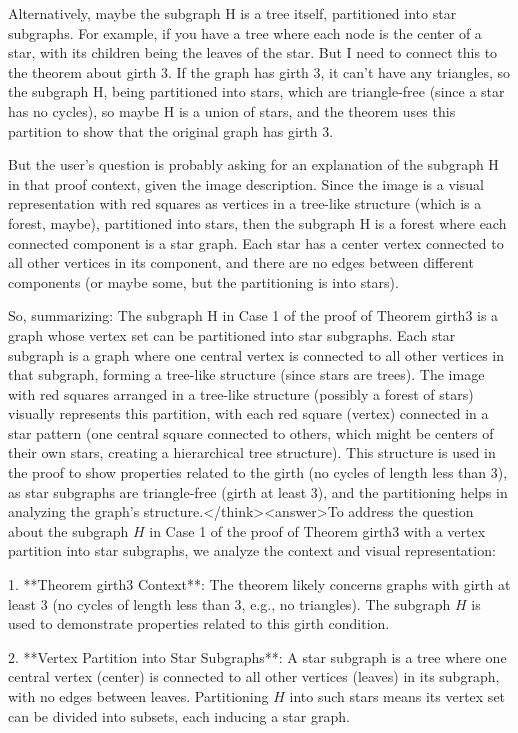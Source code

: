 Alternatively, maybe the subgraph H is a tree itself, partitioned into star subgraphs. For example, if you have a tree where each node is the center of a star, with its children being the leaves of the star. But I need to connect this to the theorem about girth 3. If the graph has girth 3, it can't have any triangles, so the subgraph H, being partitioned into stars, which are triangle-free (since a star has no cycles), so maybe H is a union of stars, and the theorem uses this partition to show that the original graph has girth 3. 

But the user's question is probably asking for an explanation of the subgraph H in that proof context, given the image description. Since the image is a visual representation with red squares as vertices in a tree-like structure (which is a forest, maybe), partitioned into stars, then the subgraph H is a forest where each connected component is a star graph. Each star has a center vertex connected to all other vertices in its component, and there are no edges between different components (or maybe some, but the partitioning is into stars). 

So, summarizing: The subgraph H in Case 1 of the proof of Theorem girth3 is a graph whose vertex set can be partitioned into star subgraphs. Each star subgraph is a graph where one central vertex is connected to all other vertices in that subgraph, forming a tree-like structure (since stars are trees). The image with red squares arranged in a tree-like structure (possibly a forest of stars) visually represents this partition, with each red square (vertex) connected in a star pattern (one central square connected to others, which might be centers of their own stars, creating a hierarchical tree structure). This structure is used in the proof to show properties related to the girth (no cycles of length less than 3), as star subgraphs are triangle-free (girth at least 3), and the partitioning helps in analyzing the graph's structure.</think><answer>To address the question about the subgraph \( H \) in Case 1 of the proof of Theorem girth3 with a vertex partition into star subgraphs, we analyze the context and visual representation:  

1. **Theorem girth3 Context**: The theorem likely concerns graphs with girth at least 3 (no cycles of length less than 3, e.g., no triangles). The subgraph \( H \) is used to demonstrate properties related to this girth condition.  

2. **Vertex Partition into Star Subgraphs**: A star subgraph is a tree where one central vertex (center) is connected to all other vertices (leaves) in its subgraph, with no edges between leaves. Partitioning \( H \) into such stars means its vertex set can be divided into subsets, each inducing a star graph.  

